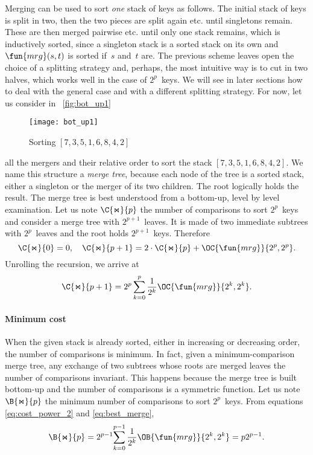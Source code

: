 Merging can be used to sort \emph{one} stack of keys as follows. The
initial stack of keys is split in two, then the two pieces are split
again etc. until singletons remain. These are then merged pairwise
etc. until only one stack remains, which is inductively sorted, since
a singleton stack is a sorted stack on its own and
\(\fun{mrg}(s,t)\) is sorted if~\(s\) and~\(t\)
are. The previous scheme leaves open the choice of a splitting
strategy and, perhaps, the most intuitive way is to cut in two halves,
which works well in the case of \(2^p\)~keys. We will see in later
sections how to deal with the general case and with a different
splitting strategy. For now, let us consider in
\fig~\vref{fig:bot_up1}
\begin{figure}
\centering
\texttt{[image: bot\_up1]}
\caption{Sorting \([7,3,5,1,6,8,4,2]\)}
\label{fig:bot_up1}
\end{figure}
all the mergers and their relative order to sort the stack \([7, 3, 5,
  1, 6, 8, 4, 2]\). We name this structure a \emph{merge
  tree}, because each node of the tree is a sorted stack, either a
singleton or the merger of its two children. The root logically holds
the result. The merge tree is best understood from a bottom\hyp{}up,
level by level examination. Let us note \(\C{\Join}{p}\) the number of
comparisons to sort \(2^p\)~keys and consider a merge tree with
\(2^{p+1}\)~leaves. It is made of two immediate subtrees with
\(2^p\)~leaves and the root holds \(2^{p+1}\)~keys. Therefore
\begin{equation*}
\C{\Join}{0} = 0,
\quad
\C{\Join}{p+1} = 2 \cdot \C{\Join}{p} + \OC{\fun{mrg}}{2^p,2^p}.
\end{equation*}
Unrolling the recursion, we arrive at
\begin{equation}
\C{\Join}{p+1}
  = 2^p\sum_{k=0}^p{\frac{1}{2^k}\OC{\fun{mrg}}{2^k,2^k}}.
\index{mrg@$\C{\Join}{n}$}
\label{eq:cost_power_2}
\end{equation}

\paragraph{Minimum cost}

When the given stack is already sorted, either in increasing or
decreasing order, the number of comparisons is minimum. In fact, given
a minimum\hyp{}comparison merge tree, any
exchange of two subtrees whose roots are merged leaves the number of
comparisons invariant. This happens because the merge tree is built
bottom\hyp{}up and the number of comparisons is a symmetric
function. Let us note \(\B{\Join}{p}\) the minimum number of
comparisons to sort \(2^p\)~keys. From equations
\eqref{eq:cost_power_2} and \eqref{eq:best_merge},
\begin{equation}
\B{\Join}{p}
  = 2^{p-1}\!\sum_{k=0}^{p-1}{\frac{1}{2^k}\OB{\fun{mrg}}{2^k,2^k}}
  = p2^{p-1}.\label{eq:best_power}\index{mrg@$\B{\Join}{n}$}
\end{equation}

